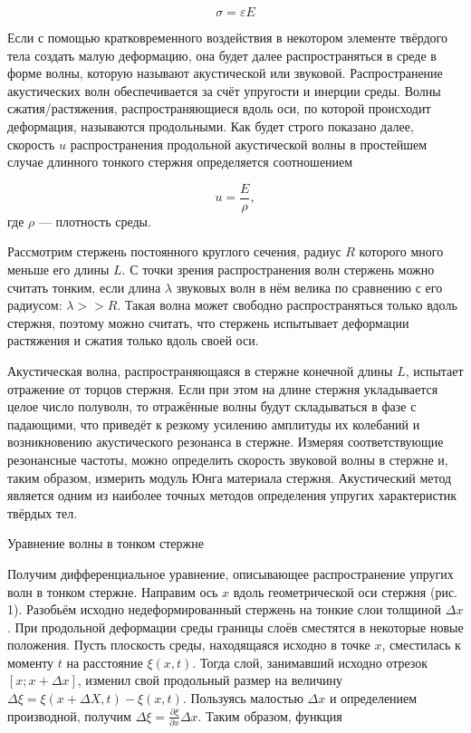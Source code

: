\documentclass[12pt, a4paper]{article}
\begin{document}
\begin{equation}
    \sigma = \varepsilon E
\end{equation}

Если с помощью кратковременного воздействия в некотором элементе
твёрдого тела создать малую деформацию, она будет далее распространяться в среде в форме волны, которую называют акустической или звуковой. Распространение акустических волн обеспечивается за счёт упругости
и инерции среды. Волны сжатия/растяжения, распространяющиеся вдоль
оси, по которой происходит деформация, называются продольными. Как
будет строго показано далее, скорость $u$ распространения продольной акустической волны в простейшем случае длинного тонкого стержня определяется соотношением

\begin{equation}
    u = \frac{E}{\rho},
\end{equation}
где $\rho$ --- плотность среды.
			
Рассмотрим стержень постоянного круглого сечения, радиус $R$ которого
много меньше его длины $L$. С точки зрения распространения волн стержень
можно считать тонким, если длина $\lambda$ звуковых волн в нём велика по сравнению с его радиусом: 
$\lambda >> R$. Такая волна может свободно распространяться только вдоль стержня, поэтому можно считать, 
что стержень испытывает деформации растяжения и сжатия только вдоль своей оси.

Акустическая волна, распространяющаяся в стержне конечной длины $L$,
испытает отражение от торцов стержня. Если при этом на длине стержня
укладывается целое число полуволн, то отражённые волны будут складываться в фазе с падающими, что приведёт к резкому усилению амплитуды
их колебаний и возникновению акустического резонанса в стержне. Измеряя соответствующие резонансные частоты, можно определить скорость
звуковой волны в стержне и, таким образом, измерить модуль Юнга материала стержня. Акустический метод является одним из наиболее точных
методов определения упругих характеристик твёрдых тел.

{\large Уравнение волны в тонком стержне \\}

Получим дифференциальное уравнение, описывающее распространение упругих волн в тонком стержне.
Направим ось $x$ вдоль геометрической оси стержня (рис. 1). Разобьём
исходно недеформированный стержень на тонкие слои толщиной $\Delta x$. При
продольной деформации среды границы слоёв сместятся в некоторые новые положения. Пусть плоскость среды, находящаяся исходно в точке $x$,
сместилась к моменту $t$ на расстояние $\xi(x,t)$. 
Тогда слой, занимавший исходно отрезок $[x; x + \Delta x]$, изменил свой продольный размер на величину
$\Delta \xi = \xi(x + \Delta X,t) − \xi(x,t)$. Пользуясь малостью $\Delta x$ и определением производной, получим $\Delta \xi = \frac{\partial\xi}{\partial x} \Delta x$. 
Таким образом, функция
\end{document}

